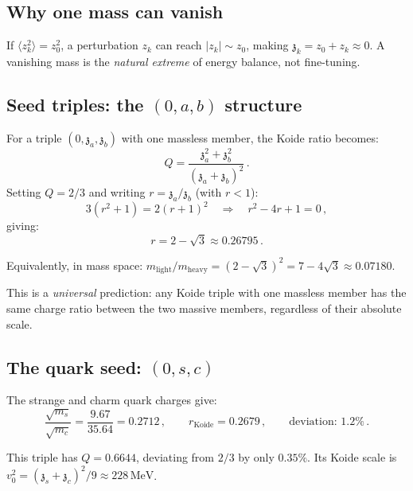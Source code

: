 \documentclass[12pt,a4paper]{article}
\newcommand{\MeV}{\,\text{MeV}}
\newcommand{\zch}{\mathfrak{z}}
\begin{document}
\subsection{Why one mass can vanish}

If $\langle z_k^2\rangle = z_0^2$, a perturbation $z_k$ can reach
$|z_k| \sim z_0$, making $\zch_k = z_0 + z_k \approx 0$. A vanishing
mass is the \emph{natural extreme} of energy balance, not fine-tuning.

\subsection{Seed triples: the $(0, a, b)$ structure}

For a triple $(0, \zch_a, \zch_b)$ with one massless member, the
Koide ratio becomes:
\begin{equation}
Q = \frac{\zch_a^2 + \zch_b^2}{(\zch_a + \zch_b)^2}\,.
\end{equation}
Setting $Q = 2/3$ and writing $r = \zch_a/\zch_b$ (with $r < 1$):
\begin{equation}
3(r^2 + 1) = 2(r + 1)^2 \quad\Longrightarrow\quad r^2 - 4r + 1 = 0\,,
\end{equation}
giving:
\begin{equation}
\boxed{r = 2 - \sqrt{3} \approx 0.26795\,.}
\end{equation}

Equivalently, in mass space:
$m_{\text{light}}/m_{\text{heavy}} = (2 - \sqrt{3})^2 = 7 - 4\sqrt{3}
\approx 0.07180$.

This is a \emph{universal} prediction: any Koide triple with one
massless member has the same charge ratio between the two massive
members, regardless of their absolute scale.

\subsection{The quark seed: $(0, s, c)$}

The strange and charm quark charges give:
\begin{equation}
\frac{\sqrt{m_s}}{\sqrt{m_c}} = \frac{9.67}{35.64} = 0.2712\,,
\qquad r_{\text{Koide}} = 0.2679\,, \qquad \text{deviation: } 1.2\%\,.
\end{equation}

This triple has $Q = 0.6644$, deviating from $2/3$ by only $0.35\%$.
Its Koide scale is $v_0^2 = (\zch_s + \zch_c)^2/9 \approx 228\MeV$.
\end{document}
